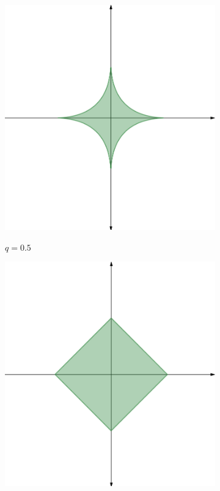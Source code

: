 \begin{figure}
\centering
	\begin{subfigure}{0.2\textwidth}
	\centering
	\includegraphics[width = \textwidth]{figures/norm_0_5.png}
	\label{norm_0_5_figure}
	\caption*{$q = 0.5$}
	\end{subfigure} \hspace{0.5cm}
	\begin{subfigure}{0.2\textwidth}
	\centering
	\includegraphics[width = \textwidth]{figures/norm_1.png}

\end{subfigure}
\end{figure}
